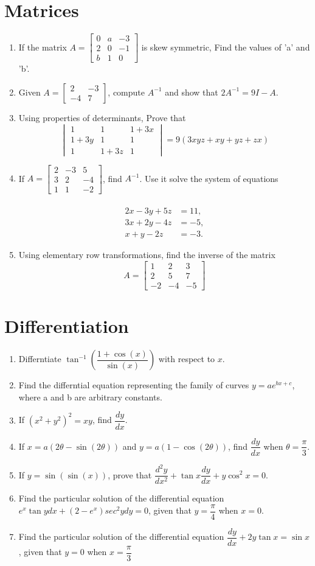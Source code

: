 \documentclass{article}
\newcommand{\myvec}[1]{\ensuremath{\begin{bmatrix}#1\end{bmatrix}}}
\newcommand{\mydet}[1]{\ensuremath{\begin{vmatrix}#1\end{vmatrix}}}
\providecommand{\brak}[1]{\ensuremath{\left(#1\right)}}
\begin{document}
\section{Matrices}
\begin{enumerate}
	\item If the matrix $ A=\myvec{
		0 & a & -3\\
		2 & 0 & -1\\
		b & 1 & 0}$ is skew symmetric, Find the values of 'a' and 'b'.
\item Given $ A = \myvec{
		2 & -3\\
		-4 & 7}$, compute $A^{-1}$ and show that $2A^{-1}=9I - A$.
\item Using properties of determinants, Prove that \[ \mydet{
		1 & 1 & 1+3x \\
		1+3y & 1 & 1 \\
		1 & 1+3z & 1}
	=9\brak{3xyz+xy+yz+zx}\]
\item If $A=\myvec{
		2 & -3 & 5 \\
		3 & 2 & -4 \\
		1 & 1 & -2}$, find $ A^{-1}$. Use it solve the system of equations\\
\\
\begin{align*}
2x-3y+5z&=11,\\3x+2y-4z&=-5,\\x+y-2z&=-3.
\end{align*}
\item Using elementary row transformations, find the inverse of the matrix 
	\[  A=\myvec{
		1 & 2 & 3\\
		2 & 5 & 7\\
		-2 & -4 & -5} \]
\end{enumerate}
\section{Differentiation}
\begin{enumerate}  
\item Differntiate $\tan^{-1} \brak{\dfrac{1+\cos(x)}{\sin(x)}}$ with respect to  $x$.
\item Find the differntial equation representing the family of curves $y=ae^{bx+c}$, where a and b are arbitrary constants.
\item If $\brak{x^{2}+y^{2}}^{2}=xy$, find $\dfrac{dy}{dx}$.
\item If $x=a\brak{2\theta - \sin \brak{2\theta}}$ and $y=a\brak{1-\cos\brak{2\theta}}$, find $\dfrac{dy}{dx}$
when $\theta = \dfrac{\pi}{3}$.
\item If $y=\sin \brak{\sin \brak{x}}$, prove that $\dfrac{d^{2}y}{dx^{2}}+\tan x \dfrac{dy}{dx}+y\cos^{2}x=0$.
\item Find the particular solution of the differential equation $e^{x}\tan y dx+\brak{2-e^{x}}sec^{2}y dy=0$, given that $y=\dfrac {\pi}{4}$ when $x=0$.
\item Find the particular solution of the differential equation $\dfrac {dy}{dx} +2y \tan x= \sin x$, given that $y=0$ when $x=\dfrac{\pi}{3}$	
\end{enumerate}
\end{document}
